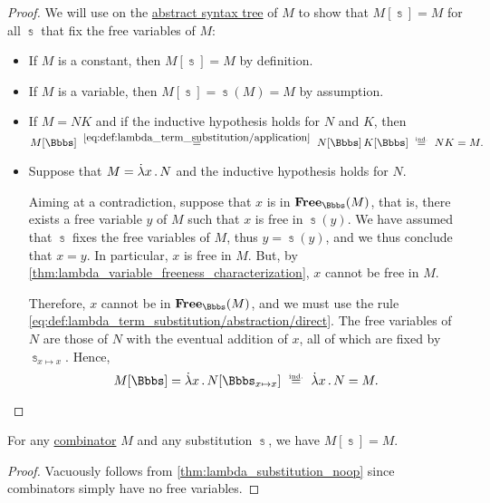 \begin{proof}
  \NecessitySubProof We will use  on the \hyperref[def:lambda_term_ast]{abstract syntax tree} of \( M \) to show that \( M[\Bbbs] = M \) for all \( \Bbbs \) that fix the free variables of \( M \):
  \begin{itemize}
    \item If \( M \) is a constant, then \( M[\Bbbs] = M \) by definition.
    \item If \( M \) is a variable, then \( M[\Bbbs] = \Bbbs(M) = M \) by assumption.
    \item If \( M = NK \) and if the inductive hypothesis holds for \( N \) and \( K \), then
    \begin{equation*}
      M[\Bbbs]
      \reloset {\eqref{eq:def:lambda_term_substitution/application}} =
      N[\Bbbs] \thinspace K[\Bbbs]
      \reloset {\T{ind.}} =
      N K
      =
      M.
    \end{equation*}

    \item Suppose that \( M = \qabs x N \) and the inductive hypothesis holds for \( N \).

    Aiming at a contradiction, suppose that \( x \) is in \( \op*{Free}_\Bbbs(M) \), that is, there exists a free variable \( y \) of \( M \) such that \( x \) is free in \( \Bbbs(y) \). We have assumed that \( \Bbbs \) fixes the free variables of \( M \), thus \( y = \Bbbs(y) \), and we thus conclude that \( x = y \). In particular, \( x \) is free in \( M \). But, by \cref{thm:lambda_variable_freeness_characterization}, \( x \) cannot be free in \( M \).

    Therefore, \( x \) cannot be in \( \op*{Free}_\Bbbs(M) \), and we must use the rule \eqref{eq:def:lambda_term_substitution/abstraction/direct}. The free variables of \( N \) are those of \( N \) with the eventual addition of \( x \), all of which are fixed by \( \Bbbs_{x \mapsto x} \). Hence,
    \begin{equation*}
      M[\Bbbs]
      =
      \qabs x N[\Bbbs_{x \mapsto x}]
      \reloset {\T{ind.}} =
      \qabs x N
      =
      M.
    \end{equation*}
  \end{itemize}
\end{proof}

\begin{corollary}\label{thm:lambda_substitution_combinators}
  For any \hyperref[def:lambda_combinator]{combinator} \( M \) and any substitution \( \Bbbs \), we have \( M[\Bbbs] = M \).
\end{corollary}
\begin{proof}
  Vacuously follows from \cref{thm:lambda_substitution_noop} since combinators simply have no free variables.
\end{proof}

